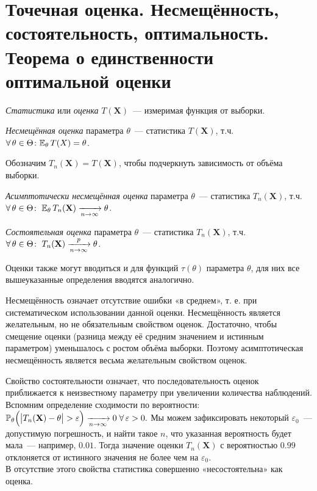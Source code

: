 \section{Точечная оценка. Несмещённость, состоятельность, оптимальность. Теорема о единственности оптимальной оценки}
\begin{defn}
    \textit{Статистика} или \textit{оценка} $T(\mathbf{X})$~--- измеримая функция от выборки.
\end{defn}

\begin{defn}
    \textit{Несмещённая оценка} параметра $\theta$~--- статистика $T(\mathbf{X})$, т.ч. $\forall \, \theta \in \Theta\colon \mathbb{E}_{\theta}\, T(X) = \theta$.
\end{defn}

Обозначим $T_n(\mathbf{X}) = T(\mathbf{X})$, чтобы подчеркнуть зависимость от объёма выборки.
\begin{defn}
    \textit{Асимптотически несмещённая оценка} параметра $\theta$~--- статистика $T_n(\mathbf{X})$, т.ч. $\forall \, \theta \in \Theta \colon \; \mathbb{E}_{\theta}\, T_n(\mathbf{X}) \xrightarrow[n \rightarrow \infty]{} \theta$.
\end{defn}

\begin{defn}
    \textit{Состоятельная оценка} параметра $\theta$~--- статистика $T_n(\mathbf{X})$, т.ч. $\forall \, \theta \in \Theta \colon \; T_n(\mathbf{X}) \xrightarrow[n \rightarrow \infty]{p} \theta$.
\end{defn}

Оценки также могут вводиться и для функций $\tau(\theta)$ параметра $\theta$, для них все вышеуказанные определения вводятся аналогично.

Несмещённость означает отсутствие ошибки «в среднем», т. е. при систематическом использовании данной оценки. 
Несмещённость является желательным, но не обязательным свойством оценок. 
Достаточно, чтобы смещение оценки (разница между её средним значением и истинным параметром) уменьшалось с ростом объёма выборки. 
Поэтому асимптотическая несмещённость является весьма желательным свойством оценок. 

Свойство состоятельности означает, что последовательность оценок приближается к неизвестному параметру при увеличении количества наблюдений. 
Вспомним определение сходимости по вероятности: ${\mathbb{P}_{\theta} \Bigl(\bigl| T_n(\mathbf{X}) - \theta \bigr| > \varepsilon \Bigr) \xrightarrow[n \to \infty]{} 0} \; \forall\,  \varepsilon > 0.$
Мы можем зафиксировать некоторый $\varepsilon_0$~--- допустимую погрешность, и найти такое $n$, что указанная вероятность будет мала~--- например, $0.01$. 
Тогда значение оценки $T_n(\mathbf{X})$ с вероятностью $0.99$ отклоняется от истинного значения не более чем на $\varepsilon_0$.\\
В отсутствие этого свойства статистика совершенно «несостоятельна» как оценка.


